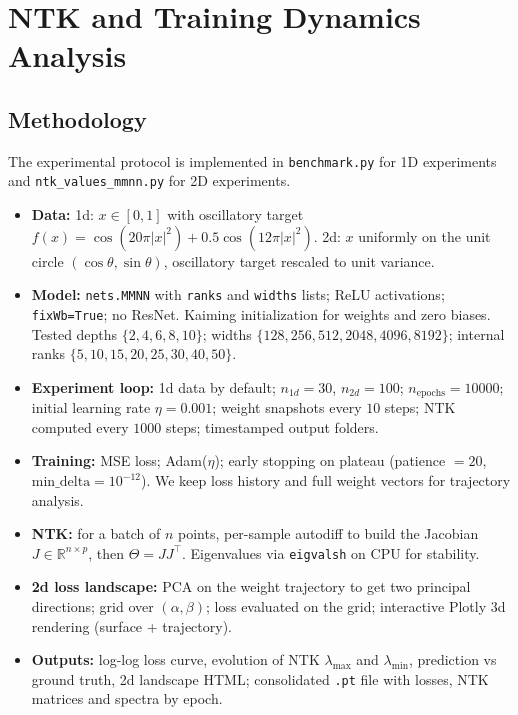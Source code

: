 \documentclass[12pt]{article}
\begin{document}
\newpage
\section{NTK and Training Dynamics Analysis}

\subsection{Methodology}

The experimental protocol is implemented in \texttt{benchmark.py} for 1D experiments and \texttt{ntk\_values\_mmnn.py} for 2D experiments.

\begin{itemize}
    \item \textbf{Data:} 1d: $x\in[0,1]$ with oscillatory target $f(x)=\cos(20\pi|x|^{2})+0.5\cos(12\pi|x|^{2})$. 2d: $x$ uniformly on the unit circle $(\cos\theta,\sin\theta)$, oscillatory target rescaled to unit variance.\\
    \item \textbf{Model:} \texttt{nets.MMNN} with \texttt{ranks} and \texttt{widths} lists; ReLU activations; \texttt{fixWb=True}; no ResNet. Kaiming initialization for weights and zero biases. Tested depths $\{2,4,6,8,10\}$; widths $\{128,256,512,2048,4096,8192\}$; internal ranks $\{5,10,15,20,25,30,40,50\}$.\\
    \item \textbf{Experiment loop:} 1d data by default; $n_{1d}=30$, $n_{2d}=100$; $n_{\text{epochs}}=10000$; initial learning rate $\eta=0.001$; weight snapshots every $10$ steps; NTK computed every $1000$ steps; timestamped output folders.\\
    \item \textbf{Training:} MSE loss; Adam($\eta$); early stopping on plateau (patience $=20$, $\text{min\_delta}=10^{-12}$). We keep loss history and full weight vectors for trajectory analysis.\\
    \item \textbf{NTK:} for a batch of $n$ points, per-sample autodiff to build the Jacobian $J\in\mathbb{R}^{n\times p}$, then $\Theta=JJ^\top$. Eigenvalues via \texttt{eigvalsh} on CPU for stability.\\
    \item \textbf{2d loss landscape:} PCA on the weight trajectory to get two principal directions; grid over $(\alpha,\beta)$; loss evaluated on the grid; interactive Plotly 3d rendering (surface + trajectory).\\
    \item \textbf{Outputs:} log-log loss curve, evolution of NTK $\lambda_{\max}$ and $\lambda_{\min}$, prediction vs ground truth, 2d landscape HTML; consolidated \texttt{.pt} file with losses, NTK matrices and spectra by epoch.
\end{itemize}
\end{document}
